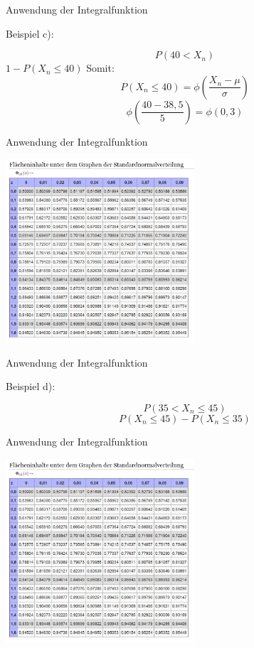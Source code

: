 \documentclass[14pt]{beamer}
\begin{document}
\begin{frame} {Anwendung der Integralfunktion}

Beispiel c):
 
 $$P(40 < X_n)$$
 $1 - P(X_n \le 40)$
 Somit: $$P(X_n \le 40) =  \phi\left(\frac{X_n - \mu}{\sigma}\right)$$
 $$ \phi\left(\frac{40 - 38,5}{5}\right) = \phi(0,3) $$

\end{frame}

\begin{frame} {Anwendung der Integralfunktion}
 
 \includegraphics[width=7.0cm]{TabelleNormalverteilung.png}

\end{frame}

\begin{frame} {Anwendung der Integralfunktion}

Beispiel d):
 
 $$P(35 < X_n \le 45)$$
 $$P(X_n \le 45) - P(X_n \le 35)$$

\end{frame}

\begin{frame} {Anwendung der Integralfunktion}
 
 \includegraphics[width=7.0cm]{TabelleNormalverteilung.png}

\end{frame}
\end{document}
